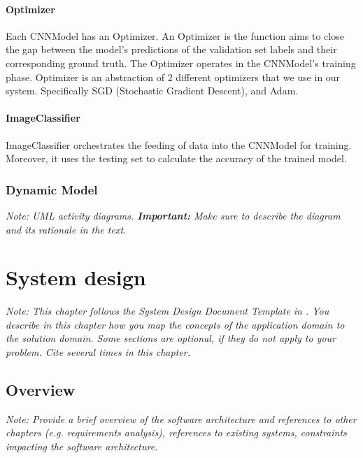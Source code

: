 \documentclass[a4paper,12pt,twoside]{report}
\begin{document}
\subsubsection{Optimizer}
Each CNNModel has an Optimizer. An Optimizer is the function aims to close the gap between the model's predictions of the validation set labels and their corresponding ground truth. The Optimizer operates in the CNNModel's training phase. Optimizer is an abstraction of 2 different optimizers that we use in our system. Specifically SGD (Stochastic Gradient Descent), and Adam.

\subsubsection{ImageClassifier}
ImageClassifier orchestrates the feeding of data into the CNNModel for training. Moreover, it uses the testing set to calculate the accuracy of the trained model.


\subsection{Dynamic Model}

\textit{Note: UML activity diagrams. \textbf{Important:} Make sure to describe the diagram and its rationale in the text.}











\chapter{System design}

\textit{Note: This chapter follows the System Design Document Template in \cite{bruegge2004object}. 
You describe in this chapter how you map the concepts of the application domain to the solution domain. Some sections are optional, if they do not apply to your problem.
Cite \cite{bruegge2004object} several times in this chapter.}

\section{Overview}

\textit{Note: Provide a brief overview of the software architecture and references to other chapters (e.g. requirements analysis), references to existing systems, constraints impacting the software architecture.}
\end{document}

